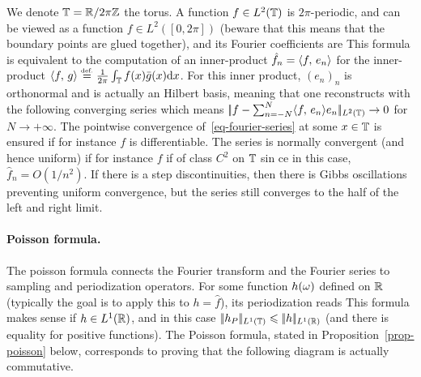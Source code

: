 We denote $\mathbb{T}=\mathbb{R}/2\pi\mathbb{Z}$ the torus.
%
A function $f \in L^2(\mathbb{T})$ is $2\pi$-periodic, and can be viewed as a function $f \in L^2([0,2\pi])$ (beware that this means that the boundary points are glued together), and its Fourier coefficients are
This formula is equivalent to the computation of an inner-product $\hat f_n = \langle f,\,e_n\rangle$ for the inner-product $\langle f,\,g\rangle \stackrel{\mbox{\upshape\tiny def.}}{=} \frac{1}{2\pi} \int_{\mathbb{T}} f(x) \bar g(x) \mathrm{d} x$. 
%
For this inner product, $(e_n)_n$ is orthonormal and is actually an Hilbert basis, meaning that one reconstructs with the following converging series 
which means $|\!| f-\sum_{n=-N}^N \langle f,\,e_n\rangle e_n |\!|_{L^2(\mathbb{T})} \rightarrow 0$ for $N \rightarrow +\infty$.
%
The pointwise convergence of~\eqref{eq-fourier-series} at some $x \in \mathbb{T}$ is ensured if for instance $f$ is differentiable. The series is normally convergent (and hence uniform) if for instance $f$ if of class $C^2$ on $\mathbb{T}$ sin ce in this case, $\hat f_n = O(1/n^2)$. 
%
If there is a step discontinuities, then there is Gibbs oscillations preventing uniform convergence, but the series still converges to the half of the left and right limit.


\paragraph{Poisson formula.}

The poisson formula connects the Fourier transform and the Fourier series to sampling and periodization operators.
%
For some function $h(\omega)$ defined on $\mathbb{R}$ (typically the goal is to apply this to $h=\hat f$), its periodization reads
This formula makes sense if $h \in L^1(\mathbb{R})$, and in this case $|\!| h_P |\!|_{L^1(\mathbb{T})} \leqslant |\!| h |\!|_{L^1(\mathbb{R})}$ (and there is equality for positive functions). 
%
The Poisson formula, stated in Proposition~\ref{prop-poisson} below, corresponds to proving that the following diagram
is actually commutative.

